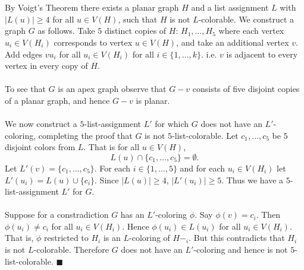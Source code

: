 \documentclass[letterpaper,12pt,oneside,onecolumn]{article}
\begin{document}
\section{}
\paragraph{}
By Voigt's Theorem there exists a planar graph $H$ and a list assignment $L$ with $|L(u)| \geq 4$ for all $u \in V(H)$, such that $H$ is not $L$-colorable. We construct a graph $G$ as follows. Take $5$ distinct copies of $H$: $H_1, \dots, H_5$ where each vertex $u_i \in V(H_i)$ corresponds to vertex $u \in V(H)$, and take an additional vertex $v$. Add edges $vu_i$ for all $u_i \in V(H_i)$ for all $i \in \{1,\dots, k\}$. i.e. $v$ is adjacent to every vertex in every copy of $H$.
\paragraph{}
To see that $G$ is an apex graph observe that $G-v$ consists of five disjoint copies of a planar graph, and hence $G-v$ is planar.
\paragraph{}
We now construct a $5$-list-assignment $L'$ for which $G$ does not have an $L'$-coloring, completing the proof that $G$ is not $5$-list-colorable. Let $c_1, \dots, c_5$ be $5$ disjoint colors from $L$. That is for all $u \in V(H)$, $$L(u) \cap \{c_1, \dots, c_5\} = \emptyset.$$
Let $L'(v) = \{c_1, \dots, c_5\}$. For each $i \in \{1, \dots, 5\}$ and for each $u_i \in V(H_i)$ let $L'(u_i) = L(u) \cup \{c_i\}$. Since $|L(u)| \geq 4$, $|L'(u_i)|\geq 5$. Thus we have a $5$-list-assignment $L'$ for $G$.
\paragraph{}
Suppose for a constradiction $G$ has an $L'$-coloring $\phi$. Say $\phi(v) = c_i$. Then $\phi(u_i) \neq c_i$ for all $u_i \in V(H_i)$. Hence $\phi(u_i) \in L(u_i)$ for all $u_i \in V(H_i)$. That is, $\phi$ restricted to $H_i$ is an $L$-coloring of $H-_i$. But this contradicts that $H_i$ is not $L$-colorable. Therefore $G$ does not have an $L'$-coloring and hence is not $5$-list-colorable. $\blacksquare$
\end{document}
